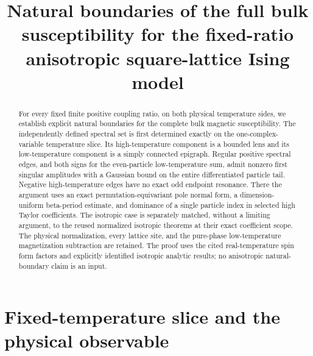 \documentclass[11pt]{article}
\title{Natural boundaries of the full bulk susceptibility\newline
for the fixed-ratio anisotropic square-lattice Ising model}
\author{}
\date{}
\numberwithin{equation}{section}
\theoremstyle{definition}
\begin{document}
\maketitle
\begin{abstract}
For every fixed finite positive coupling ratio, on both physical
temperature sides, we establish explicit natural boundaries for the
complete bulk magnetic susceptibility. The independently defined
spectral set is first determined exactly on the one-complex-variable
temperature slice. Its high-temperature component is a bounded lens and
its low-temperature component is a simply connected epigraph. Regular
positive spectral edges, and both signs for the even-particle low-temperature
sum, admit nonzero first singular amplitudes with a Gaussian bound on the
entire differentiated particle tail. Negative high-temperature edges have
no exact odd endpoint resonance. There the argument uses an exact
permutation-equivariant pole normal form, a dimension-uniform beta-period
estimate, and dominance of a single particle index in selected high Taylor
coefficients. The isotropic case is separately matched, without a limiting
argument, to the reused normalized isotropic theorems at their exact
coefficient scope. The physical normalization, every lattice site, and the
pure-phase low-temperature magnetization subtraction are retained. The
proof uses the cited real-temperature spin form factors and explicitly
identified isotropic analytic results; no anisotropic natural-boundary
claim is an input. \end{abstract}
\tableofcontents

\section{Fixed-temperature slice and the physical observable}\label{sec:physical}
\end{document}
